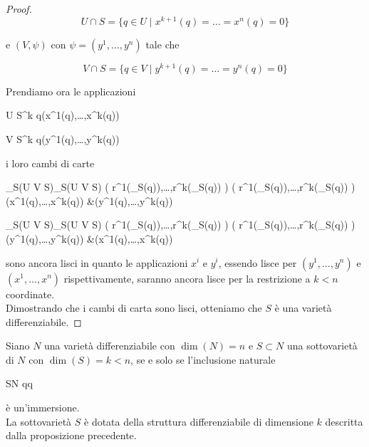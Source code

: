 \begin{proof}
	\begin{equation}
		U \cap S = \{ q \in U \mid x^{k+1}(q) = \dots = x^{n}(q) = 0 \}
	\end{equation}
	
	e $ (V,\psi) $ con $ \psi = (y^{1},\dots,y^{n}) $ tale che
	
	\begin{equation}
		V \cap S = \{ q \in V \mid y^{k+1}(q) = \dots = y^{n}(q) = 0 \}
	\end{equation}

	Prendiamo ora le applicazioni
	
		{U \cap S}{\R^{k}}
		{q}{(x^{1}(q),\dots,x^{k}(q))}

		{V \cap S}{\R^{k}}
		{q}{(y^{1}(q),\dots,y^{k}(q))}

	i loro cambi di carte
	
		{\phi_{S}(U \cap V \cap S)}{\psi_{S}(U \cap V \cap S)}
		{\left( r^{1}(\phi_{S}(q)),\dots,r^{k}(\phi_{S}(q)) \right)}{%
			\left( r^{1}(\psi_{S}(q)),\dots,r^{k}(\psi_{S}(q)) \right)\\
			(x^{1}(q),\dots,x^{k}(q)) &\mapsto (y^{1}(q),\dots,y^{k}(q))}
	
	\map{\phi_{S} \circ \psi_{S}^{-1}}
		{\psi_{S}(U \cap V \cap S)}{\phi_{S}(U \cap V \cap S)}
		{\left( r^{1}(\psi_{S}(q)),\dots,r^{k}(\psi_{S}(q)) \right)}{%
			\left( r^{1}(\phi_{S}(q)),\dots,r^{k}(\phi_{S}(q)) \right)\\
			(y^{1}(q),\dots,y^{k}(q)) &\mapsto (x^{1}(q),\dots,x^{k}(q))}

	sono ancora lisci in quanto le applicazioni $ x^{i} $ e $ y^{i} $, essendo lisce per $ (y^{1},\dots,y^{n}) $ e $ (x^{1},\dots,x^{n}) $ rispettivamente, saranno ancora lisce per la restrizione a $ k < n $ coordinate.\\
	Dimostrando che i cambi di carta sono lisci, otteniamo che $ S $ è una varietà differenziabile.
\end{proof}

\begin{definition}
	Siano $ N $ una varietà differenziabile con $ \dim(N) = n $ e $ S \subset N $ una sottovarietà di $ N $ con $ \dim(S)=k<n $, se e solo se l'inclusione naturale
	
		{S}{N}
		{q}{q}

	è un'immersione.\\
	La sottovarietà $ S $ è dotata della struttura differenziabile di dimensione $ k $ descritta dalla proposizione precedente.
\end{definition}

